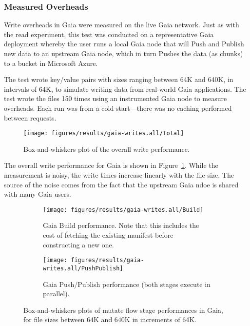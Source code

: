 \subsubsection{Measured Overheads}

Write overheads in Gaia were measured on the live Gaia network.  Just as with
the read experiment, this test was conducted on a representative Gaia deployment
whereby the user runs a local Gaia node that will Push and Publish new data to
an upstream Gaia node, which in turn Pushes the data (as chunks) to a bucket in
Microsoft Azure.

The test wrote key/value pairs with sizes ranging between 64K and 640K, in
intervals of 64K, to simulate writing
data from real-world Gaia applications.  The test wrote the files 150 times
using an instrumented Gaia node to measure overheads.  Each run was from a cold
start---there was no caching performed between requests.

\begin{figure}[htp!]
   \centering
   \texttt{[image: figures/results/gaia-writes.all/Total]}
   \caption{Box-and-whiskers plot of the overall write performance.}
   \label{fig:gaia-write-total}
\end{figure}

The overall write performance for Gaia is shown in
Figure~\ref{fig:gaia-write-total}.  While the measurement is noisy, the write
times increase linearly with the file size.  The source of the noise comes from
the fact that the upstream Gaia ndoe is shared with many Gaia users.

\begin{figure}[htp!]
   \centering
   \begin{subfigure}[b]{.8\textwidth}
      \texttt{[image: figures/results/gaia-writes.all/Build]}
      \label{fig:gaia-write-build}
      \caption{Gaia Build performance.  Note that this includes the cost of
      fetching the existing manifest before constructing a new one.}
   \end{subfigure}
   \begin{subfigure}[b]{.8\textwidth}
      \texttt{[image: figures/results/gaia-writes.all/PushPublish]}
      \label{fig:gaia-write-pushpublish}
      \caption{Gaia Push/Publish performance (both stages execute in parallel).}
   \end{subfigure}
   \caption{Box-and-whiskers plots of mutate flow stage performances in Gaia,
   for file sizes between 64K and 640K in increments of 64K.}
   \label{fig:gaia-write-stages}
\end{figure}

